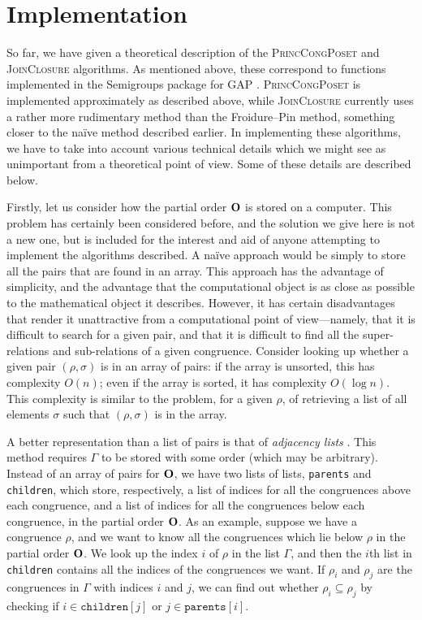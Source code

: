 \section{Implementation}
\label{sec:lattice-implementation}

So far, we have given a theoretical description of the \textsc{PrincCongPoset}
and \textsc{JoinClosure} algorithms.  As mentioned above, these correspond to
functions implemented in the Semigroups package \cite{semigroups} for GAP
\cite{gap}.  \textsc{PrincCongPoset} is implemented approximately as described
above, while \textsc{JoinClosure} currently uses a rather more rudimentary
method than the Froidure--Pin method, something closer to the na\"ive method
described earlier.  In implementing these algorithms, we have to take into
account various technical details which we might see as unimportant from a
theoretical point of view.  Some of these details are described below.

Firstly, let us consider how the partial order $\mathbf{O}$ is stored on a computer.
This problem has certainly been considered before, and the solution we give here
is not a new one, but is included for the interest and aid of anyone attempting
to implement the algorithms described.  A na\"ive approach would be simply to
store all the pairs that are found in an array.  This approach has the advantage
of simplicity, and the advantage that the computational object is as close as
possible to the mathematical object it describes.  However, it has certain
disadvantages that render it unattractive from a computational point of
view---namely, that it is difficult to search for a given pair, and that it is
difficult to find all the super-relations and sub-relations of a given
congruence.  Consider looking up whether a given pair $(\rho,\sigma)$ is in an
array of pairs: if the array is unsorted, this has complexity $O(n)$; even if
the array is sorted, it has complexity $O(\log n)$.  This complexity is similar
to the problem, for a given $\rho$, of retrieving a list of all elements
$\sigma$ such that $(\rho, \sigma)$ is in the array.

A better representation than a list of pairs is that of \textit{adjacency lists}
\cite{adj_list}.  This method requires $\Gamma$ to be stored with some
order (which may be arbitrary).  Instead of an array of pairs for $\mathbf{O}$, we have
two lists of lists, \texttt{parents} and \texttt{children}, which store,
respectively, a list of indices for all the congruences above each congruence,
and a list of indices for all the congruences below each congruence, in the
partial order $\mathbf{O}$.  As an example, suppose we have a congruence $\rho$, and we
want to know all the congruences which lie below $\rho$ in the partial order
$\mathbf{O}$.  We look up the index $i$ of $\rho$ in the list $\Gamma$, and then the
$i$th list in \texttt{children} contains all the indices of the congruences we
want.  If $\rho_i$ and $\rho_j$ are the congruences in $\Gamma$ with indices $i$
and $j$, we can find out whether $\rho_i \subseteq \rho_j$ by checking if
$i \in \mathtt{children}[j]$ or $j \in \mathtt{parents}[i]$.

